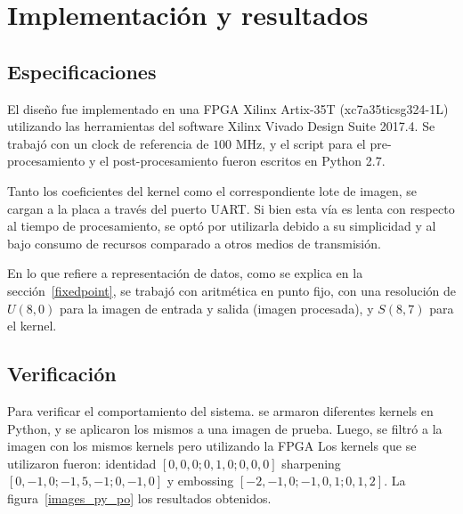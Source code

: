 \chapter{Implementación y resultados}  \label{implementations_sec}

\section{Especificaciones}

El diseño fue implementado en una FPGA Xilinx Artix-35T (xc7a35ticsg324-1L)
utilizando las herramientas del software Xilinx Vivado Design Suite 2017.4. Se
trabajó con un clock de referencia de $100$ MHz, y el script para el
pre-procesamiento y el post-procesamiento fueron escritos en Python 2.7. 

Tanto los coeficientes del kernel como el correspondiente lote de imagen, se
cargan a la placa a través del puerto UART. Si bien esta vía es lenta con
respecto al tiempo de procesamiento, se optó por utilizarla debido a su
simplicidad y al bajo consumo de recursos comparado a otros medios de
transmisión.

En lo que refiere a representación de datos, como se explica en la
sección~\ref{fixedpoint}, se trabajó con aritmética en punto fijo, con una
resolución de $U(8,0)$ para la imagen de entrada y salida (imagen procesada), y
$S(8,7)$ para el kernel.

\section{Verificación}

Para verificar el comportamiento del sistema. se armaron diferentes kernels
en Python, y se aplicaron los mismos a una imagen de prueba. Luego, 
se filtró a la imagen con los mismos kernels  pero utilizando la FPGA
Los kernels que se utilizaron fueron: identidad $[0, 0, 0; 0, 1, 0; 0, 0,
0]$ sharpening $[0, -1, 0; -1, 5, -1; 0, -1, 0]$ y embossing $[-2, -1, 0; -1,
0, 1; 0, 1, 2]$. La figura~\ref{images_py_po} los resultados obtenidos.

